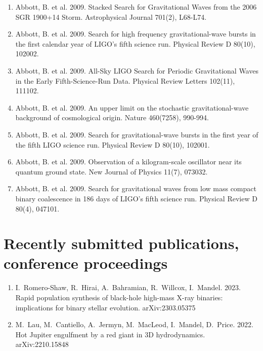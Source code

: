 \documentclass[margin,line]{res}
\begin{document}
\begin{resume}
\begin{enumerate}
\item Abbott, B. et al. 2009. Stacked Search for Gravitational Waves from the 2006 SGR 1900+14 Storm. Astrophysical Journal 701(2), L68-L74. 

\item Abbott, B. et al. 2009. Search for high frequency gravitational-wave bursts in the first calendar year of LIGO's fifth science run. Physical Review D 80(10),  102002. 

\item Abbott, B. et al. 2009. All-Sky LIGO Search for Periodic Gravitational Waves in the Early Fifth-Science-Run Data. Physical Review Letters 102(11), 111102. 

\item Abbott, B. et al. 2009. An upper limit on the stochastic gravitational-wave background of cosmological origin. Nature 460(7258), 990-994. 

\item Abbott, B. et al. 2009. Search for gravitational-wave bursts in the first year of the fifth LIGO science run. Physical Review D 80(10), 102001. 

\item Abbott, B. et al. 2009. Observation of a kilogram-scale oscillator near its quantum ground state. New Journal of Physics 11(7), 073032.

\item Abbott, B. et al. 2009. Search for gravitational waves from low mass compact binary coalescence in 186 days of LIGO's fifth science run. Physical Review D 80(4), 047101. 

\end{enumerate}

\section{\sc Recently submitted publications, conference proceedings}

\begin{enumerate}

\item I.~Romero-Shaw, R.~Hirai, A.~Bahramian, R.~Willcox, I.~Mandel. 2023. Rapid population synthesis of black-hole high-mass X-ray binaries: implications for binary stellar evolution.  arXiv:2303.05375

\item M.~Lau, M.~Cantiello, A.~Jermyn, M.~MacLeod, I.~Mandel, D.~Price.  2022.  Hot Jupiter engulfment by a red giant in 3D hydrodynamics.  arXiv:2210.15848


\end{enumerate}
\end{resume}
\end{document}

